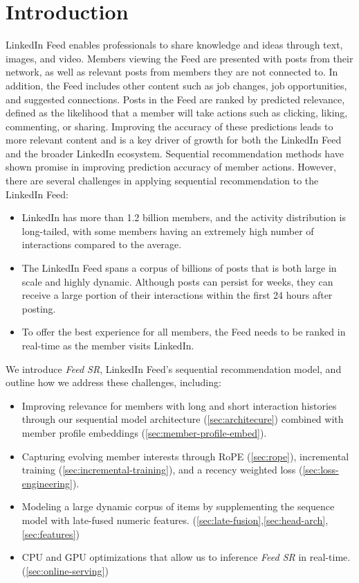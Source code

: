 \documentclass[sigconf]{acmart}
\newcommand{\systemname}{\textit{Feed SR}}
\begin{document}
\begingroup
\renewcommand{\thefootnote}{\fnsymbol{footnote}}
\endgroup


\section{Introduction}
LinkedIn Feed enables professionals to share knowledge and ideas through text, images, and video. Members viewing the Feed are presented with posts from their network, as well as relevant posts from members they are not connected to. In addition, the Feed includes other content such as job changes, job opportunities, and suggested connections. Posts in the Feed are ranked by predicted relevance, defined as the likelihood that a member will take actions such as clicking, liking, commenting, or sharing. Improving the accuracy of these predictions leads to more relevant content and is a key driver of growth for both the LinkedIn Feed and the broader LinkedIn ecosystem. Sequential recommendation methods have shown promise in improving prediction accuracy of member actions. However, there are several challenges in applying sequential recommendation to the LinkedIn Feed:
\begin{itemize}
    \item LinkedIn has more than 1.2 billion members, and the activity distribution is long-tailed, with some members having an extremely high number of interactions compared to the average.
    \item The LinkedIn Feed spans a corpus of billions of posts that is both large in scale and highly dynamic. Although posts can persist for weeks, they can receive a large portion of their interactions within the first 24 hours after posting.
    \item To offer the best experience for all members, the Feed needs to be ranked in real-time as the member visits LinkedIn.
\end{itemize}
We introduce {\systemname}, LinkedIn Feed’s sequential recommendation model, and outline how we address these challenges, including:
\begin{itemize}
    \item Improving relevance for members with long and short interaction histories through our sequential model architecture (\ref{sec:architecure}) combined with member profile embeddings (\ref{sec:member-profile-embed}).
    \item Capturing evolving member interests through RoPE \cite{su2024roformer} (\ref{sec:rope}), incremental training (\ref{sec:incremental-training}), and a recency weighted loss (\ref{sec:loss-engineering}).
    \item Modeling a large dynamic corpus of items by supplementing the sequence model with late-fused numeric features. (\ref{sec:late-fusion},\ref{sec:head-arch},\ref{sec:features})
    \item CPU and GPU optimizations that allow us to inference {\systemname} in real-time. (\ref{sec:online-serving})
\end{itemize}
\end{document}
